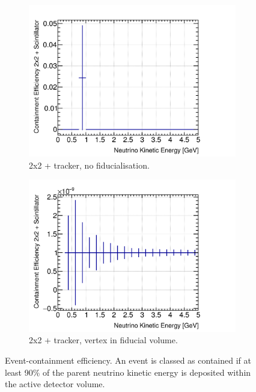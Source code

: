 \documentclass[10pt,a4paper,openany]{article}
\begin{document}
\begin{figure}[htbp]
\begin{subfigure}[b]{0.49\textwidth}
		\includegraphics[width=1.0\textwidth]{E_cont_eff_2x2_Scintillator_gap.png}
		\caption{2x2 + tracker, no fiducialisation.}
		\label{}
	\end{subfigure}	
	\hfill
	\begin{subfigure}[b]{0.49\textwidth}
		\centering
		\includegraphics[width=1.0\textwidth]{E_cont_eff_2x2_Scintillator_fiducial_gap.png}
		\caption{2x2 + tracker, vertex in fiducial volume.}
		\label{}
	\end{subfigure}
  \caption{Event-containment efficiency. An event is classed as contained if at least 90\% of the parent neutrino kinetic energy is deposited within the active detector volume.}
\end{figure}
\end{document}
